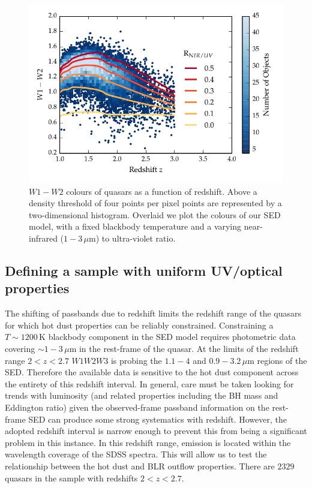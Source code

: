 \begin{figure}[t!]
\centering
\includegraphics[width=\columnwidth]{figures/chapter05/w1w2_versus_redshift_ratio.pdf}
\caption[{$W1 - W2$ colours of quasars as a function of redshift.}]{$W1 - W2$ colours of quasars as a function of redshift. Above a density threshold of four points per pixel points are represented by a two-dimensional histogram. Overlaid we plot the colours of our SED model, with a fixed blackbody temperature and a varying near-infrared ($1 - 3$\,$\mu$m) to ultra-violet ratio.}
  \label{fig:w1w2colorsratio}
\end{figure}

\subsection{Defining a sample with uniform UV/optical properties}
\label{sec:ch5-hotdustsample}

The shifting of passbands due to redshift limits the redshift range of the quasars for which hot dust properties can be reliably constrained.
Constraining a $T\sim1200$\,K blackbody component in the SED model requires photometric data covering $\sim1-3$\,$\mu$m in the rest-frame of the quasar.
At the limits of the redshift range $2 < z < 2.7$ $W1W2W3$ is probing the $1.1-4$ and $0.9-3.2$\,$\mu$m regions of the SED.
Therefore the available data is sensitive to the hot dust component across the entirety of this redshift interval.
In general, care must be taken looking for trends with luminosity (and related properties including the BH mass and Eddington ratio) given the observed-frame passband information on the rest-frame SED can produce some strong systematics with redshift.
However, the adopted redshift interval is narrow enough to prevent this from being a significant problem in this instance.
In this redshift range,  emission is located within the wavelength coverage of the SDSS spectra.
This will allow us to test the relationship between the hot dust and BLR outflow properties.
There are $2329$ quasars in the sample with redshifts $2 < z < 2.7$.

